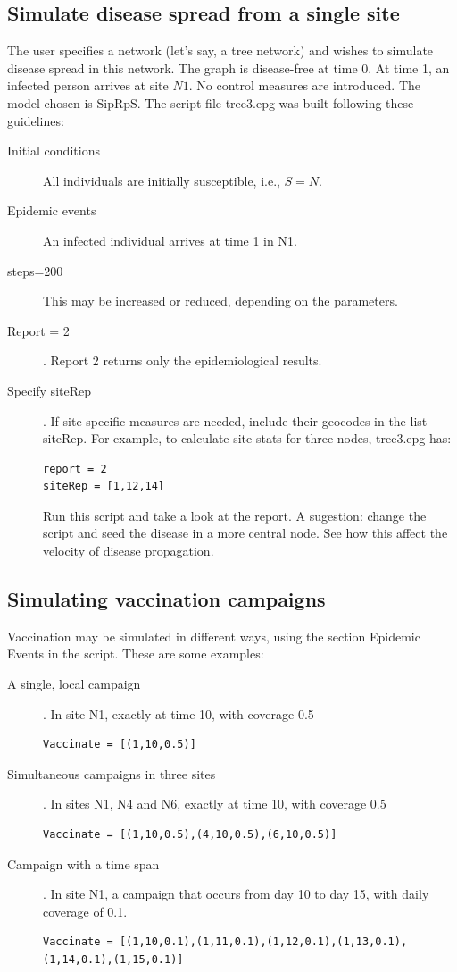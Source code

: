 \subsection{Simulate disease spread from a single site}
The user specifies a network (let's say, a tree network) and wishes to simulate disease spread in this network. The graph is disease-free at time 0. At time 1, an infected person arrives at site $N1$. No control measures are introduced. The model chosen is SipRpS. 
The script file tree3.epg was built following these guidelines:
\begin{description}
\item[Initial conditions] All individuals are initially susceptible, i.e.,  $S=N$.  
\item[Epidemic events] An infected individual arrives at time 1 in N1.
\item[steps=200] This may be increased or reduced, depending on the parameters.
\item[Report = 2]. Report 2 returns only the epidemiological results.
\item[Specify siteRep]. If site-specific measures are needed, include their geocodes in the list siteRep. For example, to calculate site stats for three nodes, tree3.epg has:
\begin{verbatim}
report = 2
siteRep = [1,12,14]
\end{verbatim}
Run this script and take a look at the report. A sugestion: change the script and seed the disease in a more central node. See how this affect the velocity of disease propagation.
\end{description}

 
\subsection{Simulating vaccination campaigns}
Vaccination may be simulated in different ways, using the section Epidemic Events in the script. These are some examples:
\begin{description}
\item[A single, local campaign].  In site N1, exactly at time 10, with coverage 0.5
\begin{verbatim}
Vaccinate = [(1,10,0.5)]
\end{verbatim}
\item[Simultaneous campaigns in three sites].  In sites N1, N4 and N6, exactly at time 10, with coverage 0.5
\begin{verbatim}
Vaccinate = [(1,10,0.5),(4,10,0.5),(6,10,0.5)]
\end{verbatim}
\item[Campaign with a time span].  In site N1, a campaign that occurs from day 10 to day 15, with daily coverage of 0.1.
\begin{verbatim}
Vaccinate = [(1,10,0.1),(1,11,0.1),(1,12,0.1),(1,13,0.1),
(1,14,0.1),(1,15,0.1)]
\end{verbatim}
\end{description}


